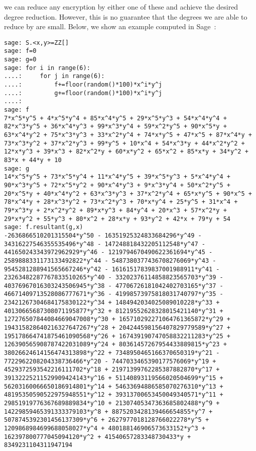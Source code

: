 \documentclass[11pt]{report}
\begin{document}
 we can reduce any encryption by either one of these and achieve the desired degree reduction. However, this is no guarantee that the degrees we are able to reduce by are small. Below, we show an example computed in Sage~\cite{sage}:
\begin{verbatim}
sage: S.<x,y>=ZZ[]
sage: f=0
sage: g=0
sage: for i in range(6):
....:     for j in range(6):
....:         f+=floor(random()*100)*x^i*y^j
....:         g+=floor(random()*100)*x^i*y^j
....:         
sage: f
7*x^5*y^5 + 4*x^5*y^4 + 85*x^4*y^5 + 29*x^5*y^3 + 54*x^4*y^4 + 82*x^3*y^5 + 36*x^4*y^3 + 99*x^3*y^4 + 59*x^2*y^5 + 90*x^5*y + 63*x^4*y^2 + 75*x^3*y^3 + 33*x^2*y^4 + 74*x*y^5 + 47*x^5 + 87*x^4*y + 73*x^3*y^2 + 37*x^2*y^3 + 99*y^5 + 10*x^4 + 54*x^3*y + 44*x^2*y^2 + 12*x*y^3 + 39*x^3 + 82*x^2*y + 60*x*y^2 + 65*x^2 + 85*x*y + 34*y^2 + 83*x + 44*y + 10
sage: g
14*x^5*y^5 + 73*x^5*y^4 + 11*x^4*y^5 + 39*x^5*y^3 + 5*x^4*y^4 + 90*x^3*y^5 + 72*x^5*y^2 + 90*x^4*y^3 + 9*x^3*y^4 + 50*x^2*y^5 + 20*x^5*y + 40*x^4*y^2 + 63*x^3*y^3 + 37*x^2*y^4 + 65*x*y^5 + 90*x^5 + 78*x^4*y + 28*x^3*y^2 + 73*x^2*y^3 + 70*x*y^4 + 25*y^5 + 31*x^4 + 79*x^3*y + 2*x^2*y^2 + 89*x*y^3 + 84*y^4 + 20*x^3 + 57*x^2*y + 29*x*y^2 + 55*y^3 + 80*x^2 + 28*x*y + 93*y^2 + 42*x + 79*y + 54
sage: f.resultant(g,x)
-2636866510201315504*y^50 - 16351925324833684296*y^49 - 34316227546355535496*y^48 - 147248818432205112548*y^47 - 441650243343972962929*y^46 - 1219794670490622361694*y^45 - 2589888331173133492822*y^44 - 5487380377436708276069*y^43 - 9545281288941565667246*y^42 - 16161517839837001988911*y^41 - 23263482287767833510265*y^40 - 33202376114858823565703*y^39 - 40376967016303243506945*y^38 - 47706726181042402703165*y^37 - 46671409713528086777671*y^36 - 41998573975818031740797*y^35 - 23421267304684175830122*y^34 + 1484942034025089010228*y^33 + 40130665687308071195877*y^32 + 81219552628328015421140*y^31 + 127276507844084669047008*y^30 + 165710292271064761365872*y^29 + 194315828640216327647267*y^28 + 204244598156407829779589*y^27 + 195178664741875461090568*y^26 + 167439190747058832211283*y^25 + 126390565908787422031089*y^24 + 80361457267954433889815*y^23 + 38026624614156474313898*y^22 + 7348950465166370650319*y^21 - 7722962208204338736466*y^20 - 7447033465390177576069*y^19 + 4529372593542216111702*y^18 + 21971399762285387882870*y^17 + 39132225211529909424143*y^16 + 51140893119566020504699*y^15 + 56203160066650186914801*y^14 + 54633694886585070276310*y^13 + 48195350590522975948551*y^12 + 39313700653450049340571*y^11 + 29851919776367689889834*y^10 + 21307405347363685802488*y^9 + 14229859465391333379103*y^8 + 8875203428139466654855*y^7 + 5078745392301456137309*y^6 + 2627977018128766022278*y^5 + 1209868984699688058027*y^4 + 480188146906573633152*y^3 + 162397800777045094120*y^2 + 41540657283348730433*y + 8349231104311947194

\end{verbatim}
\end{document}
